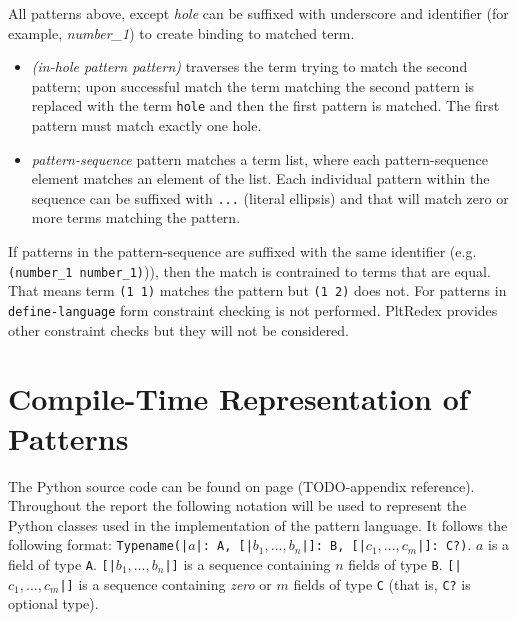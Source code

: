 All patterns above, except \textit{hole} can be suffixed with underscore and identifier (for example, \textit{number\_1}) to create binding to matched term.

\begin{itemize}
\item
\textit{(in-hole pattern pattern)} traverses the term trying to match the second pattern; upon successful match the term matching the second pattern is replaced with the term \texttt{hole} and then the first pattern is matched. The first pattern must match exactly one hole.

\item
\textit{pattern-sequence} pattern matches a term list, where each pattern-sequence element matches an element of the list. Each individual pattern within the sequence can be suffixed with \texttt{...} (literal ellipsis) and that will match zero or more terms matching the pattern.
\end{itemize}

If patterns in the pattern-sequence are suffixed with the same identifier (e.g. \texttt{(number\_1 number\_1)})), then the match is contrained to terms that are equal. That means term \texttt{(1 1)} matches the pattern but \texttt{(1 2)} does not. For patterns in \texttt{define-language} form constraint checking is not performed. PltRedex provides other constraint checks but they will not be considered.

\section{Compile-Time Representation of Patterns}

The Python source code can be found on page (TODO-appendix reference). Throughout the report the following notation will be used to represent the Python classes used in the implementation of the pattern language. It follows the following format: \texttt{Typename(|$a$|: A, [|$b_1,...,b_n$|]: B, [|$c_1,...,c_m$|]: C?)}. $a$ is a field of type \texttt{A}. \texttt{[|$b_1,...,b_n$|]} is a sequence containing $n$ fields of type \texttt{B}. \texttt{[|$c_1,...,c_m$|]} is a sequence containing \textit{zero} or $m$ fields of type \texttt{C} (that is, \texttt{C?} is optional type).

